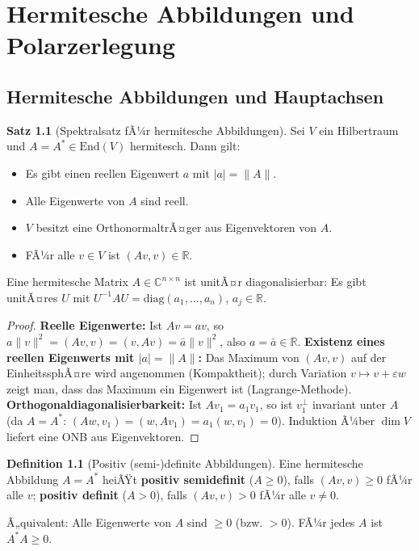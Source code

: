 ﻿\documentclass[a4paper,12pt]{report}
\theoremstyle{definition}
\newtheorem{definition}{Definition}
\newtheorem{satz}{Satz}
\begin{document}
\chapter{Hermitesche Abbildungen und Polarzerlegung}

\section{Hermitesche Abbildungen und Hauptachsen}


\begin{satz}[Spektralsatz fÃ¼r hermitesche Abbildungen]
    Sei $V$ ein Hilbertraum und $A = A^* \in \mathrm{End}(V)$
    hermitesch. Dann gilt:
    \begin{itemize}
        \item[-] Es gibt einen reellen Eigenwert $a$ mit $|a| = \|A\|$.
        \item[-] Alle Eigenwerte von $A$ sind reell.
        \item[-] $V$ besitzt eine OrthonormaltrÃ¤ger aus Eigenvektoren von $A$.
        \item[-] FÃ¼r alle $v \in V$ ist $(Av, v) \in \mathbb{R}$.
    \end{itemize}
    Eine hermitesche Matrix $A \in \mathbb{C}^{n \times n}$ ist unitÃ¤r
    diagonalisierbar: Es gibt unitÃ¤res $U$ mit $U^{-1}AU = \mathrm{diag}(a_1, \dots, a_n)$,
    $a_j \in \mathbb{R}$.
\end{satz}
\begin{proof}
    \textbf{Reelle Eigenwerte:} Ist $Av = av$, so $a\|v\|^2 = (Av, v) = (v, Av) = \bar{a}\|v\|^2$,
    also $a = \bar{a} \in \mathbb{R}$.
    \textbf{Existenz eines reellen Eigenwerts mit $|a| = \|A\|$:}
    Das Maximum von $(Av, v)$ auf der EinheitssphÃ¤re wird angenommen
    (Kompaktheit); durch Variation $v \mapsto v + \varepsilon w$ zeigt man,
    dass das Maximum ein Eigenwert ist (Lagrange-Methode).
    \textbf{Orthogonaldiagonalisierbarkeit:} Ist $Av_1 = a_1 v_1$, so ist
    $v_1^\perp$ invariant unter $A$ (da $A = A^*$: $(Aw, v_1) = (w, Av_1) = a_1(w,v_1) = 0$).
    Induktion Ã¼ber $\dim V$ liefert eine ONB aus Eigenvektoren.
\end{proof}


\begin{definition}[Positiv (semi-)definite Abbildungen]
    Eine hermitesche Abbildung $A = A^*$ heiÃŸt \textbf{positiv semidefinit}
    ($A \geq 0$), falls $(Av, v) \geq 0$ fÃ¼r alle $v$;
    \textbf{positiv definit} ($A > 0$), falls $(Av, v) > 0$ fÃ¼r alle
    $v \neq 0$.

    Ã„quivalent: Alle Eigenwerte von $A$ sind $\geq 0$ (bzw. $> 0$).
    FÃ¼r jedes $A$ ist $A^*A \geq 0$.
\end{definition}
\end{document}
